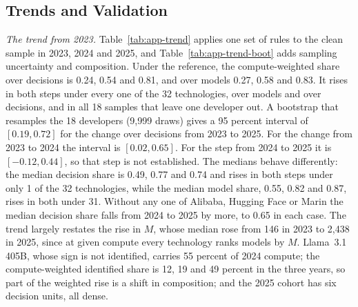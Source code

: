 \subsection{Trends and Validation}\label{app:wedge-trends}

\textit{The trend from 2023.} Table~\ref{tab:app-trend} applies one set of rules to the clean sample in 2023, 2024 and
2025, and Table~\ref{tab:app-trend-boot} adds sampling uncertainty and composition. Under the reference, the
compute-weighted share over decisions is 0.24, 0.54 and 0.81, and over models 0.27, 0.58 and 0.83. It rises in both steps
under every one of the 32 technologies, over models and over decisions, and in all 18 samples that leave one developer
out. A bootstrap that resamples the 18 developers (9,999 draws) gives a 95 percent interval of $[0.19,0.72]$ for the change
over decisions from 2023 to 2025. For the change from 2023 to 2024 the interval is $[0.02,0.65]$. For the step from 2024
to 2025 it is $[-0.12,0.44]$, so that step is not established. The medians behave differently: the median decision share
is 0.49, 0.77 and 0.74 and rises in both steps under only 1 of the 32 technologies, while the median model share, 0.55,
0.82 and 0.87, rises in both under 31. Without any one of Alibaba, Hugging Face or Marin the median decision share falls
from 2024 to 2025 by more, to 0.65 in each case. The trend largely restates the rise in $M$, whose median rose from 146 in
2023 to 2,438 in 2025, since at given compute every technology ranks models by $M$. Llama~3.1 405B, whose sign is not
identified, carries 55 percent of 2024 compute; the compute-weighted identified share is 12, 19 and 49 percent in the
three years, so part of the weighted rise is a shift in composition; and the 2025 cohort has six decision units, all
dense.

